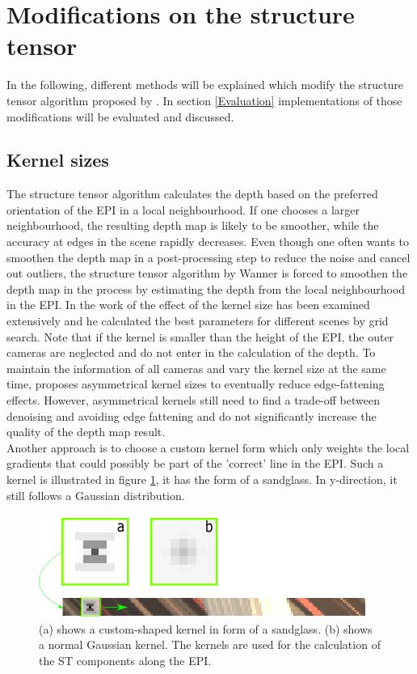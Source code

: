 \documentclass  [
  paper    = a4,
  BCOR     = 10mm,
  twoside,
  fontsize = 12pt,
  fleqn,
  toc      = bibnumbered,
  toc      = listofnumbered,
  numbers  = noendperiod,
  headings = normal,
  listof   = leveldown,
  version  = 3.03
]                                       {scrreprt}
\begin{document}
 \section{Modifications on the structure tensor}
 In the following, different methods will be explained which modify the structure tensor algorithm proposed by \cite{wanner2014orientation}. In section \ref{Evaluation} implementations of those modifications will be evaluated and discussed.
 \subsection{Kernel sizes}
 The structure tensor algorithm calculates the depth based on the preferred orientation of the EPI in a local neighbourhood. If one chooses a larger neighbourhood, the resulting depth map is likely to be smoother, while the accuracy at edges in the scene rapidly decreases.
 Even though one often wants to smoothen the depth map in a post-processing step to reduce the noise and cancel out outliers, the structure tensor algorithm by Wanner is forced to smoothen the depth map in the process by estimating the depth from the local neighbourhood in the EPI. In the work of \cite{wanner2014orientation} the effect of the kernel size has been examined extensively and he calculated the best parameters for different scenes by grid search. Note that if the kernel is smaller than the height of the EPI, the outer cameras are neglected and do not enter in the calculation of the depth. To maintain the information of all cameras and vary the kernel size at the same time, \cite{diebold2016light} proposes asymmetrical kernel sizes to eventually reduce edge-fattening effects. However, asymmetrical kernels still need to find a trade-off between denoising and avoiding edge fattening and do not significantly increase the quality of the depth map result.\\
 Another approach is to choose a custom kernel form which only weights the local gradients that could possibly be part of the 'correct' line in the EPI. Such a kernel is illustrated in figure \ref{fig:sandclock},  it has the form of a sandglass. In y-direction, it still follows a Gaussian distribution.
 \begin{figure}[h!]
 	\centering
 	\includegraphics[width=0.7\linewidth]{images/sandclock.png}
 	\caption[Sandglass kernel]{(a) shows a custom-shaped kernel in form of a sandglass. (b) shows a normal Gaussian kernel. The kernels are used for the calculation of the ST components along the EPI.}
 	\label{fig:sandclock}
 \end{figure}
\end{document}
